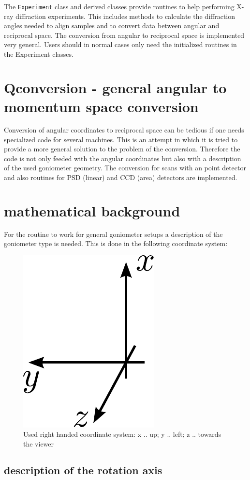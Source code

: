 
The {\tt Experiment} class and derived classes provide routines to help performing X-ray diffraction experiments. This includes methods to calculate the diffraction angles needed to align samples and to convert data between angular and reciprocal space. The conversion from angular to reciprocal space is implemented very general. Users should in normal cases only need the initialized routines in the Experiment classes.

\section{Qconversion - general angular to momentum space conversion}

Conversion of angular coordinates to reciprocal space can be tedious if one needs specialized code for several machines. This is an attempt in which it is tried to provide a more general solution to the problem of the conversion. Therefore the code is not only feeded with the angular coordinates but also with a description of the used goniometer geometry. The conversion for scans with an point detector and also routines for PSD (linear) and CCD (area) detectors are implemented.

\section{mathematical background}

 For the routine to work for general goniometer setups a description of the goniometer type is needed. This is done in the following coordinate system:

\begin{figure}[H]
 \centering
 \includegraphics[width=0.13\linewidth]{pics/coordinate_system}
 \caption{Used right handed coordinate system: x .. up; y .. left; z .. towards the viewer}
 \label{fig:def_coordinate_system}
\end{figure}

\subsection*{description of the rotation axis}

